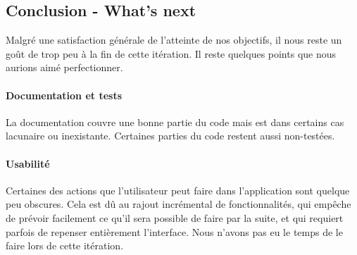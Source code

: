 \subsection{Conclusion - What's next}
Malgré une satisfaction générale de l'atteinte de nos objectifs, il nous reste 
un goût de trop peu à la fin de cette itération. Il reste quelques points que 
nous aurions aimé perfectionner.

	\paragraph{Documentation et tests} 
	La documentation couvre une bonne partie du code mais est dans certains cas 
	lacunaire ou inexistante. Certaines parties du code restent aussi non-testées.

	\paragraph{Usabilité} 
	Certaines des actions que l'utilisateur peut faire dans l'application sont
	quelque peu obscures. Cela est dû au rajout incrémental de fonctionnalités, 
	qui empêche de prévoir facilement ce qu'il sera possible de faire par la suite, 
	et qui requiert parfois de repenser entièrement l'interface. Nous n'avons
	pas eu le temps de le faire lors de cette itération.
